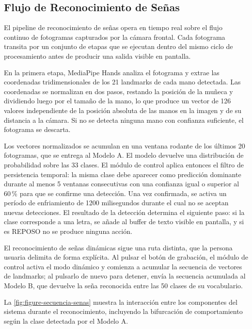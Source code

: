 \subsection{Flujo de Reconocimiento de Señas}

El pipeline de reconocimiento de señas opera en tiempo real sobre el flujo continuo
de fotogramas capturados por la cámara frontal. Cada fotograma transita por un conjunto
de etapas que se ejecutan dentro del mismo ciclo de procesamiento antes de producir una
salida visible en pantalla.

En la primera etapa, MediaPipe Hands analiza el fotograma y extrae las coordenadas
tridimensionales de los 21 landmarks de cada mano detectada. Las coordenadas se
normalizan en dos pasos, restando la posición de la muñeca y dividiendo luego por el
tamaño de la mano, lo que produce un vector de 126 valores independiente de la posición
absoluta de las manos en la imagen y de su distancia a la cámara. Si no se detecta
ninguna mano con confianza suficiente, el fotograma se descarta.

Los vectores normalizados se acumulan en una ventana rodante de los últimos 20
fotogramas, que se entrega al Modelo A. El modelo devuelve una distribución de
probabilidad sobre las 33 clases. El módulo de control aplica entonces el
filtro de persistencia temporal: la misma clase debe aparecer como predicción
dominante durante al menos 5 ventanas consecutivas con una confianza igual o
superior al 60\,\% para que se confirme una detección. Una vez confirmada, se activa un
período de enfriamiento de 1200 milisegundos durante el cual no se aceptan nuevas
detecciones. El resultado de la detección determina el siguiente paso: si la clase
corresponde a una letra, se añade al buffer de texto visible en pantalla, y si es REPOSO
no se produce ninguna acción.

El reconocimiento de señas dinámicas sigue una ruta distinta, que la persona usuaria
delimita de forma explícita. Al pulsar el botón de grabación, el módulo de control activa
el modo dinámico y comienza a acumular la secuencia de vectores de landmarks; al pulsarlo
de nuevo para detener, envía la secuencia acumulada al Modelo B, que devuelve la seña
reconocida entre las 50 clases de su vocabulario.

La \autoref{fig:figure-secuencia-senas} muestra la interacción entre los componentes
del sistema durante el reconocimiento, incluyendo la bifurcación de comportamiento
según la clase detectada por el Modelo A.

